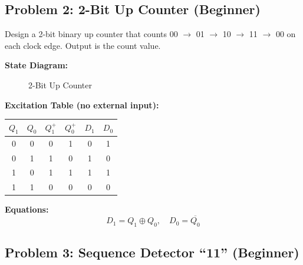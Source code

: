 \documentclass[12pt,a4paper]{article}
\begin{document}
\subsection{Problem 2: 2-Bit Up Counter (Beginner)}

\begin{infobox}
Design a 2-bit binary up counter that counts 00 $\to$ 01 $\to$ 10 $\to$ 11 $\to$ 00 on each clock edge. Output is the count value.
\end{infobox}

\textbf{State Diagram:}

\begin{figure}[H]
\centering
{}
\caption{2-Bit Up Counter}
\end{figure}

\textbf{Excitation Table (no external input):}

\begin{table}[H]
\centering
\begin{tabular}{cc|cc|cc}
\toprule
$Q_1$ & $Q_0$ & $Q_1^+$ & $Q_0^+$ & $D_1$ & $D_0$ \\
\midrule
0 & 0 & 0 & 1 & 0 & 1 \\
0 & 1 & 1 & 0 & 1 & 0 \\
1 & 0 & 1 & 1 & 1 & 1 \\
1 & 1 & 0 & 0 & 0 & 0 \\
\bottomrule
\end{tabular}
\end{table}

\textbf{Equations:}
\[
D_1 = Q_1 \oplus Q_0, \quad D_0 = \overline{Q_0}
\]


\subsection{Problem 3: Sequence Detector ``11'' (Beginner)}
\end{document}
